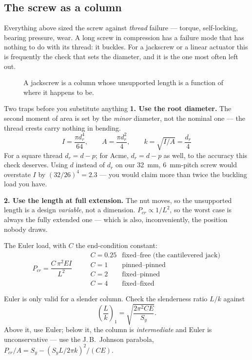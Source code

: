 \documentclass[11pt,a4paper]{article}
\begin{document}
\subsection{The screw as a column}
\label{sec:column}

Everything above sized the screw against \emph{thread} failure --- torque, self-locking, bearing
pressure, wear. A long screw in compression has a failure mode that has nothing to do with its
thread: it buckles. For a jackscrew or a linear actuator this is frequently the check that sets the
diameter, and it is the one most often left out.

\begin{figure}[H]\centering
\resizebox{0.78\textwidth}{!}{}
\caption{A jackscrew is a column whose unsupported length is a function of where it happens to be.}
\label{fig:column}
\end{figure}

\begin{keybox}{Two traps before you substitute anything}
\textbf{1. Use the root diameter.} The second moment of area is set by the \emph{minor} diameter,
not the nominal one --- the thread crests carry nothing in bending.
\[
I=\frac{\pi d_r^{4}}{64},\qquad A=\frac{\pi d_r^{2}}{4},\qquad k=\sqrt{I/A}=\frac{d_r}{4}
\]
For a square thread $d_r = d-p$; for Acme, $d_r = d-p$ as well, to the accuracy this check deserves.
Using $d$ instead of $d_r$ on our \SI{32}{mm}, \SI{6}{mm}-pitch screw would overstate $I$ by
$(32/26)^4 = 2.3$ --- you would claim more than twice the buckling load you have.

\medskip
\textbf{2. Use the length at full extension.} The nut moves, so the unsupported length is a design
\emph{variable}, not a dimension. $P_{cr}\propto 1/L^{2}$, so the worst case is always the fully
extended one --- which is also, inconveniently, the position nobody draws.
\end{keybox}

\medskip
The Euler load, with $C$ the end-condition constant:
\[
\boxed{\;P_{cr}=\frac{C\,\pi^{2}EI}{L^{2}}\;}
\qquad
\begin{array}{ll}
C=0.25 & \text{fixed--free (the cantilevered jack)}\\
C=1 & \text{pinned--pinned}\\
C=2 & \text{fixed--pinned}\\
C=4 & \text{fixed--fixed}
\end{array}
\]

\medskip
Euler is only valid for a slender column. Check the slenderness ratio $L/k$ against
\[
\left(\frac{L}{k}\right)_{\!1}=\sqrt{\frac{2\pi^{2}CE}{S_y}} .
\]
Above it, use Euler; below it, the column is \emph{intermediate} and Euler is unconservative --- use
the J.\,B.\ Johnson parabola, $P_{cr}/A = S_y - (S_y L/2\pi k)^{2}/(CE)$.
\end{document}
